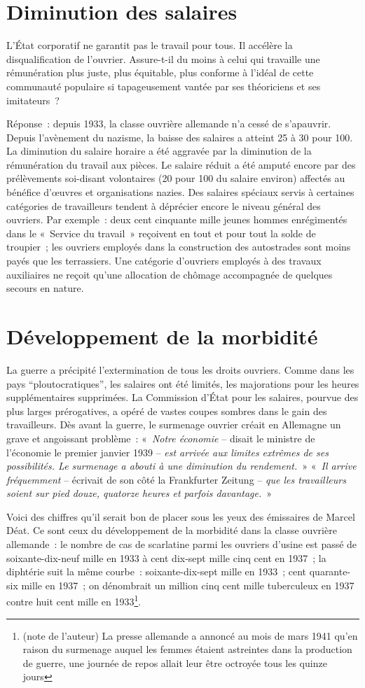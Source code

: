 \documentclass[french,twoside]{book} %
\begin{document}
\section[{Diminution des salaires}]{Diminution des salaires}
\noindent L’État corporatif ne garantit pas le travail pour tous. Il accélère la disqualification de l’ouvrier. Assure-t-il du moins à celui qui travaille une rémunération plus juste, plus équitable, plus conforme à l’idéal de cette communauté populaire si tapageusement vantée par ses théoriciens et ses imitateurs ?\par
Réponse : depuis 1933, la classe ouvrière allemande n’a cessé de s’apauvrir. Depuis l’avènement du nazisme, la baisse des salaires a atteint 25 à 30 pour 100. La diminution du salaire horaire a été aggravée par la diminution de la rémunération du travail aux pièces. Le salaire réduit a été amputé encore par des prélèvements soi-disant volontaires (20 pour 100 du salaire environ) affectés au bénéfice d’œuvres et organisations nazies. Des salaires spéciaux servis à certaines catégories de travailleurs tendent à déprécier encore le niveau général des ouvriers. Par exemple : deux cent cinquante mille jeunes hommes enrégimentés dans le « Service du travail » reçoivent en tout et pour tout la solde de troupier ; les ouvriers employés dans la construction des autostrades sont moins payés que les terrassiers. Une catégorie d’ouvriers employés à des travaux auxiliaires ne reçoit qu’une allocation de chômage accompagnée de quelques secours en nature.
\section[{Développement de la morbidité}]{Développement de la morbidité}
\noindent La guerre a précipité l’extermination de tous les droits ouvriers. Comme dans les pays “ploutocratiques”, les salaires ont été limités, les majorations pour les heures supplémentaires supprimées. La Commission d’État pour les salaires, pourvue des plus larges prérogatives, a opéré de vastes coupes sombres dans le gain des travailleurs. Dès avant la guerre, le surmenage ouvrier créait en Allemagne un grave et angoissant problème : « \emph{Notre économie} – disait le ministre de l’économie le premier janvier 1939 – \emph{est arrivée aux limites extrêmes de ses possibilités. Le surmenage a abouti à une diminution du rendement.} » « \emph{Il arrive fréquemment} – écrivait de son côté la Frankfurter Zeitung – \emph{que les travailleurs soient sur pied douze, quatorze heures et parfois davantage.} »\par
Voici des chiffres qu’il serait bon de placer sous les yeux des émissaires de Marcel Déat. Ce sont ceux du développement de la morbidité dans la classe ouvrière allemande : le nombre de cas de scarlatine parmi les ouvriers d’usine est passé de soixante-dix-neuf mille en 1933 à cent dix-sept mille cinq cent en 1937 ; la diphtérie suit la même courbe : soixante-dix-sept mille en 1933 ; cent quarante-six mille en 1937 ; on dénombrait un million cinq cent mille tuberculeux en 1937 contre huit cent mille en 1933\footnote{(note de l’auteur) La presse allemande a annoncé au mois de mars 1941 qu’en raison du surmenage auquel les femmes étaient astreintes dans la production de guerre, une journée de repos allait leur être octroyée tous les quinze jours}.
\end{document}
